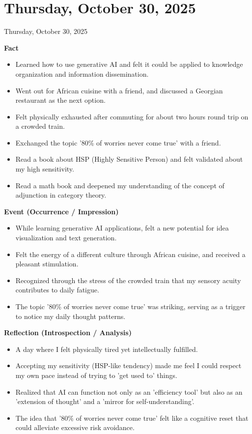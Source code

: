 \documentclass[dvipdfmx, autodetect-engine, aspectratio=169, 10.5pt]{beamer}
\begin{document}
\section{Thursday, October 30, 2025}
\begin{frame}{Thursday, October 30, 2025}
	\tiny

	\textbf{Fact}
	\begin{itemize}
		\item Learned how to use generative AI and felt it could be applied to knowledge organization and information dissemination.
		\item Went out for African cuisine with a friend, and discussed a Georgian restaurant as the next option.
		\item Felt physically exhausted after commuting for about two hours round trip on a crowded train.
		\item Exchanged the topic '80\% of worries never come true' with a friend.
		\item Read a book about HSP (Highly Sensitive Person) and felt validated about my high sensitivity.
		\item Read a math book and deepened my understanding of the concept of adjunction in category theory.
	\end{itemize}

	\textbf{Event (Occurrence / Impression)}
	\begin{itemize}
		\item While learning generative AI applications, felt a new potential for idea visualization and text generation.
		\item Felt the energy of a different culture through African cuisine, and received a pleasant stimulation.
		\item Recognized through the stress of the crowded train that my sensory acuity contributes to daily fatigue.
		\item The topic '80\% of worries never come true' was striking, serving as a trigger to notice my daily thought patterns.
	\end{itemize}

	\textbf{Reflection (Introspection / Analysis)}
	\begin{itemize}
		\item A day where I felt physically tired yet intellectually fulfilled.
		\item Accepting my sensitivity (HSP-like tendency) made me feel I could respect my own pace instead of trying to 'get used to' things.
		\item Realized that AI can function not only as an 'efficiency tool' but also as an 'extension of thought' and a 'mirror for self-understanding'.
		\item The idea that '80\% of worries never come true' felt like a cognitive reset that could alleviate excessive risk avoidance.
	\end{itemize}


\end{frame}
\end{document}
